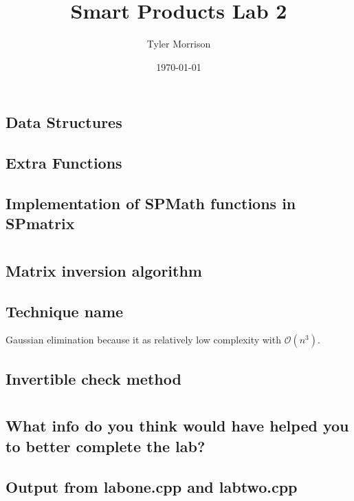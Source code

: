 \documentclass{article}
\title{Smart Products Lab 2}
\author{Tyler Morrison}
\date\today
\begin{document}
\maketitle
\section{}
\subsection{Data Structures}
\subsection{Extra Functions}
\subsection{Implementation of SPMath functions in SPmatrix}

\section{}
\subsection{Matrix inversion algorithm}
\subsection{Technique name}
Gaussian elimination because it as relatively low complexity with $\mathcal{O}(n^3)$.
\subsection{Invertible check method}

\section{}
\subsection{What info do you think would have helped you to better complete the lab?}
\subsection{Output from labone.cpp and labtwo.cpp}

\end{document}

